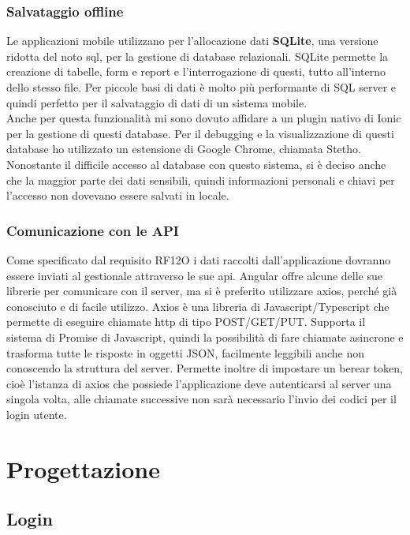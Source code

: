 \subsubsection{Salvataggio offline}
Le applicazioni mobile utilizzano per l'allocazione dati \textbf{SQLite}, una versione ridotta del noto \acrshort{sql}, per la gestione di
\gls{database} relazionali. SQLite permette la creazione di tabelle, form e report e l'interrogazione di questi, tutto all'interno dello
stesso file. Per piccole basi di dati è molto più performante di SQL server e quindi perfetto per il salvataggio di dati di un sistema
mobile. \\
\noindent Anche per questa funzionalità mi sono dovuto affidare a un plugin nativo di Ionic per la gestione di questi database. Per il
debugging e la visualizzazione di questi database ho utilizzato un estensione di Google Chrome, chiamata Stetho.\\
\noindent Nonostante il difficile accesso al database con questo sistema, si è deciso anche che la maggior parte dei dati sensibili, quindi
informazioni personali e chiavi per l'accesso non dovevano essere salvati in locale. 

\subsubsection{Comunicazione con le API}
Come specificato dal requisito RF12O i dati raccolti dall'applicazione dovranno essere inviati al gestionale attraverso le sue \gls{api}.
Angular offre alcune delle sue librerie per comunicare con il server, ma si è preferito utilizzare axios, perché già conosciuto e di facile
utilizzo. Axios è una libreria di Javascript/Typescript che permette di eseguire chiamate \gls{http} di tipo POST/GET/PUT. Supporta il sistema di
Promise di Javascript, quindi la possibilità di fare chiamate asincrone e trasforma tutte le risposte in oggetti JSON, facilmente leggibili
anche non conoscendo la struttura del server. Permette inoltre di impostare un berear token, cioè l'istanza di axios che possiede
l'applicazione deve autenticarsi al server una singola volta, alle chiamate successive non sarà necessario l'invio dei codici per il login
utente.

\section{Progettazione}
\subsection{Login}

